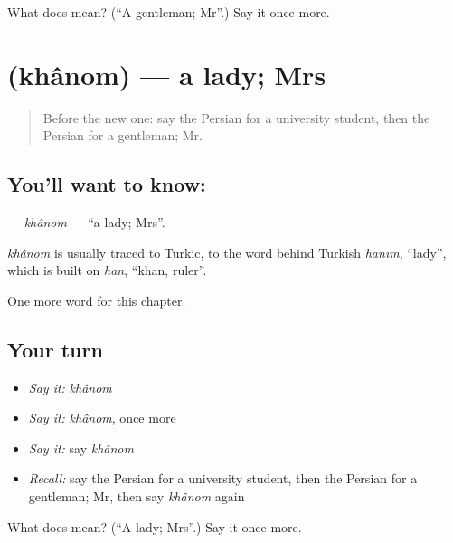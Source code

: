 \begin{tcolorbox}[breakable,colback=teal!4,colframe=teal!35!black,title={Before you move on}]
What does  mean? (\textquotedblleft{}A gentleman; Mr\textquotedblright{}.) Say it once more.
\end{tcolorbox}
\section[\texorpdfstring{\fa{خانم} (khânom)}{خانم (khânom)}]{ (khânom) — a lady; Mrs}

\label{lesson:FA-C34-khanom}



\begin{quote}
Before the new one: say the Persian for a university student, then the Persian for a gentleman; Mr.
\end{quote}

\subsection*{You'll want to know: }
\textbf{} — \emph{khânom} — \textquotedblleft{}a lady; Mrs\textquotedblright{}.

\begin{cousinweb}
\emph{khânom} is usually traced to Turkic, to the word behind Turkish \emph{hanım}, \textquotedblleft{}lady\textquotedblright{}, which is built on \emph{han}, \textquotedblleft{}khan, ruler\textquotedblright{}.
\end{cousinweb}

\begin{grammarlens}[title={What you've built}]
One more word for this chapter.
\end{grammarlens}

\subsection*{Your turn}
\begin{itemize}
\raggedright
  \item \emph{Say it:} \emph{khânom}
  \item \emph{Say it:} \emph{khânom}, once more
  \item \emph{Say it:} say \emph{khânom}
  \item \emph{Recall:} say the Persian for a university student, then the Persian for a gentleman; Mr, then say \emph{khânom} again
\end{itemize}

\begin{tcolorbox}[breakable,colback=teal!4,colframe=teal!35!black,title={Before you move on}]
What does  mean? (\textquotedblleft{}A lady; Mrs\textquotedblright{}.) Say it once more.
\end{tcolorbox}
